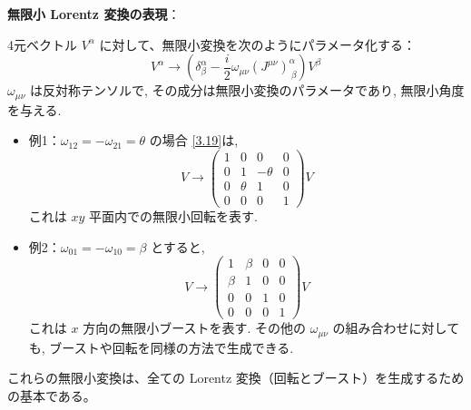 \documentclass[a4paper,12pt]{article}
\begin{document}

\vspace{1em}
\textbf{無限小 Lorentz 変換の表現}：

4元ベクトル $V^\alpha$ に対して、無限小変換を次のようにパラメータ化する：
\begin{equation*}
V^\alpha \rightarrow \left( \delta^\alpha_\beta - \frac{i}{2} \omega_{\mu\nu}(J^{\mu\nu})^\alpha_{\ \beta} \right)V^\beta \label{3.19}\tag{3.19}
\end{equation*}
$\omega_{\mu\nu}$ は反対称テンソルで, その成分は無限小変換のパラメータであり, 無限小角度を与える.
\begin{itemize}
  \item 例1：$\omega_{12} = -\omega_{21} = \theta$ の場合 \eqref{3.19}は,
  \begin{equation*}
  V \rightarrow 
  \begin{pmatrix}
  1 & 0 & 0 & 0 \\
  0 & 1 & -\theta & 0 \\
  0 & \theta & 1 & 0 \\
  0 & 0 & 0 & 1
  \end{pmatrix}
  V \tag{3.20}
  \end{equation*}
  これは $xy$ 平面内での無限小回転を表す.

  \item 例2：$\omega_{01} = -\omega_{10} = \beta$ とすると,
  \begin{equation*}
  V \rightarrow 
  \begin{pmatrix}
  1 & \beta & 0 & 0 \\
  \beta & 1 & 0 & 0 \\
  0 & 0 & 1 & 0 \\
  0 & 0 & 0 & 1
  \end{pmatrix}
  V \tag{3.21}
  \end{equation*}
  これは $x$ 方向の無限小ブーストを表す. その他の $\omega_{\mu\nu}$ の組み合わせに対しても, ブーストや回転を同様の方法で生成できる.
\end{itemize}

これらの無限小変換は、全ての Lorentz 変換（回転とブースト）を生成するための基本である。
\end{document}
